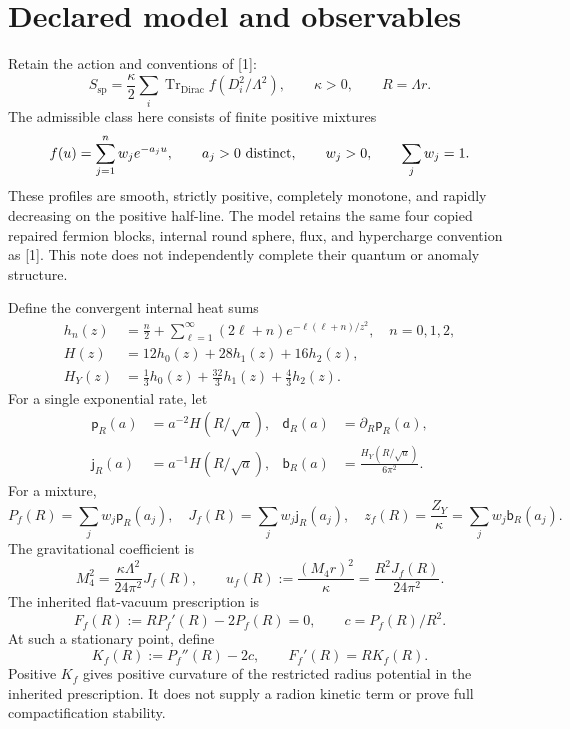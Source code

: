 \documentclass[11pt,letterpaper]{article}
\DeclareMathOperator{\Tr}{Tr}
\newcommand{\pker}{\mathsf p}
\newcommand{\jker}{\mathsf j}
\newcommand{\bker}{\mathsf b}
\newcommand{\dker}{\mathsf d}
\begin{document}
\section{Declared model and observables}

Retain the action and conventions of [1]:
\begin{equation}
 S_{\mathrm{sp}}=\frac{\kappa}{2}\sum_i\Tr_{\mathrm{Dirac}}
 f(D_i^2/\Lambda^2),\qquad \kappa>0,\qquad R=\Lambda r.
\end{equation}
The admissible class here consists of finite positive mixtures
\begin{equation}
 f(u)=\sum_{j=1}^n w_j e^{-a_j u},\qquad
 a_j>0\ \hbox{distinct},\qquad w_j>0,\qquad \sum_j w_j=1.
\end{equation}
These profiles are smooth, strictly positive, completely monotone, and rapidly decreasing on the positive half-line. The model retains the same four copied repaired fermion blocks, internal round sphere, flux, and hypercharge convention as [1]. This note does not independently complete their quantum or anomaly structure.

Define the convergent internal heat sums
\begin{align}
 h_n(z)&=\frac n2+\sum_{\ell=1}^{\infty}(2\ell+n)e^{-\ell(\ell+n)/z^2},\quad n=0,1,2,\\
 H(z)&=12h_0(z)+28h_1(z)+16h_2(z),\\
 H_Y(z)&=\tfrac13h_0(z)+\tfrac{32}3h_1(z)+\tfrac43h_2(z).
\end{align}
For a single exponential rate, let
\begin{align}
 \pker_R(a)&=a^{-2}H(R/\sqrt a),&
 \dker_R(a)&=\partial_R\pker_R(a),\\
 \jker_R(a)&=a^{-1}H(R/\sqrt a),&
 \bker_R(a)&=\frac{H_Y(R/\sqrt a)}{6\pi^2}.
\end{align}
For a mixture,
\begin{equation}
 P_f(R)=\sum_jw_j\pker_R(a_j),\quad
 J_f(R)=\sum_jw_j\jker_R(a_j),\quad
 z_f(R)=\frac{Z_Y}{\kappa}=\sum_jw_j\bker_R(a_j).
\end{equation}
The gravitational coefficient is
\begin{equation}
 M_4^2=\frac{\kappa\Lambda^2}{24\pi^2}J_f(R),\qquad
 u_f(R):=\frac{(M_4r)^2}{\kappa}=\frac{R^2J_f(R)}{24\pi^2}.
\end{equation}
The inherited flat-vacuum prescription is
\begin{equation}
 F_f(R):=R P_f'(R)-2P_f(R)=0,\qquad c=P_f(R)/R^2.
\label{eq:flat}
\end{equation}
At such a stationary point, define
\begin{equation}
 K_f(R):=P_f''(R)-2c,\qquad F_f'(R)=R K_f(R).
\label{eq:curvature}
\end{equation}
Positive $K_f$ gives positive curvature of the restricted radius potential in the inherited prescription. It does not supply a radion kinetic term or prove full compactification stability.
\end{document}
